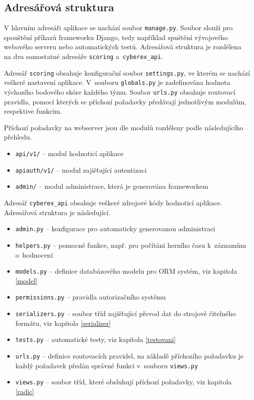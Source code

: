 \documentclass[
  digital,
  twoside,
  table, 
  nolof, 
  nolot
]{fithesis3}
\begin{document}
\subsection{Adresářová struktura}
V hlavním adresáři aplikace se nachází soubor \texttt{manage.py}. Soubor slouží pro spouštění příkazů frameworku Django, tedy například spuštění vývojového webového serveru nebo automatických testů. Adresářová struktura je rozdělena na dva samostatné adresáře \texttt{scoring} a~\texttt{cyberex\_api}.

Adresář \texttt{scoring} obsahuje konfigurační soubor \texttt{settings.py}, ve kterém se nachází veškeré nastavení aplikace. V~souboru \texttt{globals.py} je zadefinována hodnota výchozího bodového skóre každého týmu. Soubor \texttt{urls.py} obsahuje routovací pravidla, pomocí kterých se příchozí požadavky předávají jednotlivým modulům, respektive funkcím.

Příchozí požadavky na webserver jsou dle modulů rozděleny podle následujícího přehledu.

\begin{itemize}
    \item \texttt{api/v1/} -- modul hodnoticí aplikace
    \item \texttt{api\-auth/v1/} -- modul zajišťující autentizaci
    \item \texttt{admin/} -- modul administrace, která je generována frameworkem
\end{itemize}

Adresář \texttt{cyberex\_api} obsahuje veškeré zdrojové kódy hodnoticí aplikace. Adresářová struktura je následující.

\begin{itemize}
    \item \texttt{admin.py} -- konfigurace pro automaticky generovanou administraci
    \item \texttt{helpers.py} -- pomocné funkce, např. pro počítání herního času k~záznamům o~hodnocení
    \item \texttt{models.py} -- definice databázového modelu pro ORM systém, viz kapitola \ref{model}
    \item \texttt{permissions.py} -- pravidla autorizačního systému
    \item \texttt{serializers.py} -- soubor tříd zajišťující převod dat do strojově čitelného formátu, viz kapitola \ref{serializer}
    \item \texttt{tests.py} -- automatické testy, viz kapitola \ref{testovani}
    \item \texttt{urls.py} -- definice routovacích pravidel, na základě příchozího požadavku je každý požadavek předán správné funkci v~souboru \texttt{views.py}
    \item \texttt{views.py} -- soubor tříd, které obsluhují příchozí požadavky, viz kapitola \ref{radic}
\end{itemize}
\end{document}
